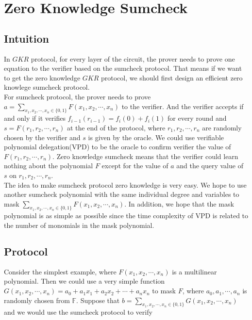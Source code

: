 

\section{Zero Knowledge Sumcheck}
\subsection{Intuition}
In $GKR$ protocol, for every layer of the circuit, the prover needs to prove one equation to the verifier based on the sumcheck protocol. That means if we want to get the zero knowledge $GKR$ protocol, we should first design an efficient zero knowlege sumcheck protocol.\\

\noindent
For sumcheck protocol, the prover needs to prove $a = \sum\limits_{x_1, x_2, \cdots, x_n \in \{0, 1\}}F(x_1, x_2, \cdots, x_n)$ to the verifier. And the verifier accepts if and only if it verifies $f_{i-1}(r_{i-1}) = f_i(0) + f_i(1)$ for every round and $s = F(r_1, r_2, \cdots, r_n)$ at the end of the protocol, where $r_1, r_2, \cdots, r_n$ are randomly chosen by the verifier and $s$ is given by the oracle. We could use verifiable polynomial delegation(VPD) to be the oracle to confirm verifier the value of $F(r_1, r_2, \cdots, r_n)$. Zero knowledge sumcheck means that the verifier could learn nothing about the polynomial $F$ except for the value of $a$ and the query value of $s$ on $r_1, r_2, \cdots, r_n$.\\

\noindent
The idea to make sumcheck protocol zero knowledge is very easy. We hope to use another sumcheck polynomial with the same individual degree and variables to mask $\sum\limits_{x_1, x_2, \cdots, x_n \in \{0, 1\}}F(x_1, x_2, \cdots, x_n)$. In addition, we hope that the mask polynomial is as simple as possible since the time complexity of VPD is related to the number of monomials in the mask polynomial.\\

\subsection{Protocol}
\noindent
Consider the simplest example, where $F(x_1, x_2, \cdots, x_n)$ is a multilinear polynomial. Then we could use a very simple function $G(x_1, x_2, \cdots, x_n) = a_0 + a_1x_1 + a_2x_2 + \cdots + a_nx_n$ to mask $F$, where $a_0, a_1, \cdots, a_n$ is randomly chosen from $\mathbb{F}$. Suppose that $b = \sum\limits_{x_1, x_2, \cdots, x_n \in \{0, 1\}}G(x_1, x_2, \cdots, x_n)$ and we would use the sumcheck protocol to verify

